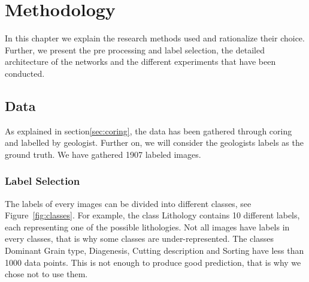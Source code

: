 \chapter{Methodology}\label{chp:methodology}
In this chapter we explain the research methods used and rationalize their choice. Further, we present the pre processing and label selection, the detailed architecture of the networks and the different experiments that have been conducted. 
\section{Data}

As explained in section\ref{sec:coring}, the data has been gathered through coring and labelled by geologist. Further on, we will consider the geologists labels as the ground truth. We have gathered 1907 labeled images. 
\subsection{Label Selection}
 The labels of every images can be divided into different classes, see Figure~\ref{fig:classes}. For example, the class Lithology contains 10 different labels, each representing one of the possible lithologies. Not all images have labels in every classes, that is why some classes are under-represented. The classes Dominant Grain type, Diagenesis, Cutting description and Sorting have less than 1000 data points. This is not enough to produce good prediction, that is why we chose not to use them.
 
